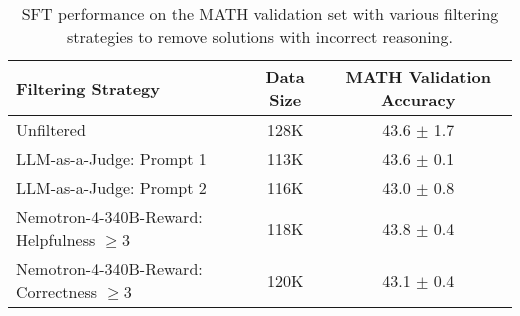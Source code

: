 \begin{table*}[!ht]
    \centering
    \caption{SFT performance on the MATH validation set with various filtering strategies to remove solutions with incorrect reasoning.}
    \label{tab:nosiy-data-sft-performance}
    \begin{tabular}{lcc}
    \toprule
     Filtering Strategy    &  Data Size & MATH Validation Accuracy \\ \midrule
     Unfiltered      & 128K &  43.6 $\pm$  1.7 \\
     LLM-as-a-Judge: Prompt 1 & 113K           &  43.6 $\pm$ 0.1 \\ 
     LLM-as-a-Judge: Prompt 2  & 116K          &  43.0 $\pm$
     0.8  
     \\
     Nemotron-4-340B-Reward: Helpfulness $\ge 3$             &  118K &  43.8 $\pm$ 0.4 \\
     Nemotron-4-340B-Reward: Correctness $\ge 3$  &  120K &  43.1 $\pm$ 0.4 
     \\  \bottomrule
    \end{tabular}
\end{table*}
